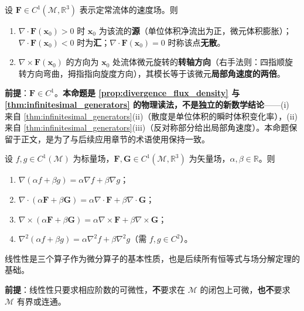 \begin{proposition}[散度与旋度的物理含义]\label{prop:divergence_meaning}
设 $\mathbf{F} \in C^1(\mathcal{M}, \mathbb{R}^3)$ 表示定常流体的速度场。则
\begin{enumerate}[label=(\roman*)]
    \item $\nabla \cdot \mathbf{F}(\mathbf{x}_0) > 0$ 时 $\mathbf x_0$ 为该流的\textbf{源}（单位体积净流出为正，微元体积膨胀）；$\nabla \cdot \mathbf{F}(\mathbf{x}_0) < 0$ 时为\textbf{汇}；$\nabla \cdot \mathbf{F}(\mathbf{x}_0) = 0$ 时称该点\textbf{无散}。
    \item $\nabla \times \mathbf{F}(\mathbf{x}_0)$ 的方向为 $\mathbf x_0$ 处流体微元旋转的\textbf{转轴方向}（右手法则：四指顺旋转方向弯曲，拇指指向旋度方向），其模长等于该微元\textbf{局部角速度的两倍}。
\end{enumerate}

\textbf{前提}：$\mathbf F\in C^1$。\textbf{本命题是 \cref{prop:divergence_flux_density} 与 \cref{thm:infinitesimal_generators} 的物理读法，不是独立的新数学结论}——(i) 来自 \cref{thm:infinitesimal_generators}(ii)（散度是单位体积的瞬时体积变化率），(ii) 来自 \cref{thm:infinitesimal_generators}(iii)（反对称部分给出局部角速度）。本命题保留于正文，是为了与后续应用章节的术语使用保持一致。
\end{proposition}

\begin{proposition}[三个算子的线性性]\label{prop:operator_linearity}
设 $f, g \in C^1(\mathcal{M})$ 为标量场，$\mathbf{F}, \mathbf{G} \in C^1(\mathcal{M}, \mathbb{R}^3)$ 为矢量场，$\alpha, \beta \in \mathbb{R}$。则
\begin{enumerate}[label=(\roman*)]
    \item $\nabla(\alpha f + \beta g) = \alpha \nabla f + \beta \nabla g$；
    \item $\nabla \cdot (\alpha \mathbf{F} + \beta \mathbf{G}) = \alpha \nabla \cdot \mathbf{F} + \beta \nabla \cdot \mathbf{G}$；
    \item $\nabla \times (\alpha \mathbf{F} + \beta \mathbf{G}) = \alpha \nabla \times \mathbf{F} + \beta \nabla \times \mathbf{G}$；
    \item $\nabla^2(\alpha f+\beta g) = \alpha\nabla^2 f+\beta\nabla^2 g$（需 $f,g\in C^2$）。
\end{enumerate}
线性性是三个算子作为微分算子的基本性质，也是后续所有恒等式与场分解定理的基础。

\textbf{前提}：线性性只要求相应阶数的可微性，\textbf{不}要求在 $\mathcal M$ 的闭包上可微，\textbf{也不}要求 $\mathcal M$ 有界或连通。
\end{proposition}

